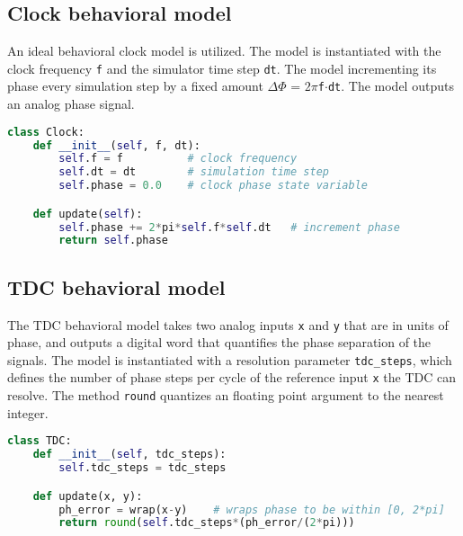 \subsection{Clock behavioral model}
An ideal behavioral clock model is utilized. The model is instantiated with the clock frequency \texttt{f} and the simulator time step \texttt{dt}. The model incrementing its phase every simulation step by a fixed amount $\Delta \Phi$ = $2\pi$\texttt{f}$\cdot$\texttt{dt}. The model outputs an analog phase signal.

\begin{lstlisting}[language={Python}, caption={Ideal clock behavioral model.}, label={clk_code}]
class Clock:
	def __init__(self, f, dt):
		self.f = f 			# clock frequency
		self.dt = dt 		# simulation time step
		self.phase = 0.0	# clock phase state variable

	def update(self):
		self.phase += 2*pi*self.f*self.dt 	# increment phase
		return self.phase
    \end{lstlisting}

\subsection{TDC behavioral model}
The TDC behavioral model takes two analog inputs \texttt{x} and \texttt{y} that are in units of phase, and outputs a digital word that quantifies the phase separation of the signals. The model is instantiated with a resolution parameter \texttt{tdc\_steps}, which defines the number of phase steps per cycle of the reference input \texttt{x} the TDC can resolve. The method \texttt{round} quantizes an floating point argument to the nearest integer.

\begin{lstlisting}[language={Python}, caption={TDC behavioral model.}, label={tdc_code}]
class TDC:
	def __init__(self, tdc_steps):
		self.tdc_steps = tdc_steps

	def update(x, y):
		ph_error = wrap(x-y) 	# wraps phase to be within [0, 2*pi]
		return round(self.tdc_steps*(ph_error/(2*pi)))
\end{lstlisting}
